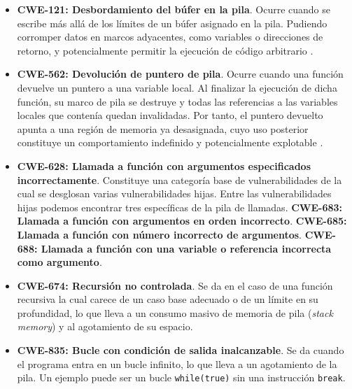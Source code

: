 \documentclass[12pt, a4paper, twoside]{article}
\begin{document}
\begin{itemize}
	\item \textbf{CWE-121: Desbordamiento del búfer en la pila}. Ocurre cuando se escribe más allá de los límites de un búfer asignado en la pila. Pudiendo corromper datos en marcos adyacentes, como variables o direcciones de retorno, y potencialmente permitir la ejecución de código arbitrario \cite{mitre-cwe-121}.
	
	\item \textbf{CWE-562: Devolución de puntero de pila}. Ocurre cuando una función devuelve un puntero a una variable local. Al finalizar la ejecución de dicha función, su marco de pila se destruye y todas las referencias a las variables locales que contenía quedan invalidadas. Por tanto, el puntero devuelto apunta a una región de memoria ya desasignada, cuyo uso posterior constituye un comportamiento indefinido y potencialmente explotable \cite{mitre-cwe-562}.
	
	\item \textbf{CWE-628: Llamada a función con argumentos especificados incorrectamente}. Constituye una categoría base de vulnerabilidades de la cual se desglosan varias vulnerabilidades hijas. Entre las vulnerabilidades hijas podemos encontrar tres específicas de la pila de llamadas.
	\subitem \textbf{CWE-683: Llamada a función con argumentos en orden incorrecto}.
	\subitem \textbf{CWE-685: Llamada a función con número incorrecto de argumentos}.
	\subitem \textbf{CWE-688: Llamada a función con una variable o referencia incorrecta como argumento}.
	
	\item \textbf{CWE-674: Recursión no controlada}. Se da en el caso de una función recursiva la cual carece de un caso base adecuado o de un límite en su profundidad, lo que lleva a un consumo masivo de memoria de pila (\textit{stack memory}) y al agotamiento de su espacio.
	
	
	\item \textbf{CWE-835: Bucle con condición de salida inalcanzable}. Se da cuando el programa entra en un bucle infinito, lo que lleva a un agotamiento de la pila. Un ejemplo puede ser un bucle \texttt{while(true)} sin una instrucción \texttt{break}.
	
\end{itemize}
\end{document}
